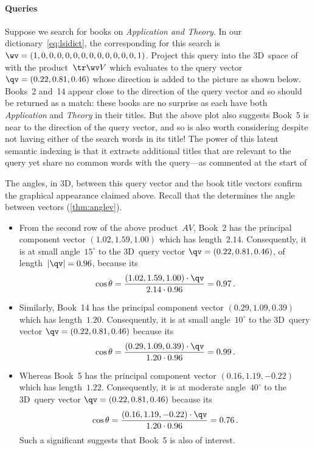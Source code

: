 \begin{reduce}
\paragraph{Queries}
Suppose we search for books on \emph{Application and Theory}.
In our dictionary~\eqref{eq:lsidict}, the corresponding  for this search is \(\wv=(1,0,0,0,0,0,0,0,0,0,0,0,0,1)\).
Project this query into the 3D~space of  with the product~\(\tr\wv V\) which evaluates to the query vector \(\qv=(0.22,0.81,0.46)\) whose direction is added to the picture as shown below.
Books~2 and~14 appear close to the direction of the query vector and so should be returned as a match: these books are no surprise as each  have both \emph{Application} and \emph{Theory} in their titles.
But the above plot also suggests Book~5 is near to the direction of the query vector, and so is also worth considering despite not having either of the search words in its title!
The power of this latent semantic indexing is that it extracts additional titles that are relevant to the query yet share no common words with the query---as commented at the start of 

The angles, in 3D, between this query vector and the book title vectors confirm the graphical appearance claimed above.
Recall that the  determines the angle between vectors (\cref{thm:anglev}).
\begin{itemize}
\item From the second row of the above product~\(AV\), Book~2 has the principal component vector \((1.02,1.59,1.00)\) which has length~\(2.14\).
Consequently, it is at small angle~\(15^\circ\) to the 3D~query vector \(\qv=(0.22,0.81,0.46)\), of length~\(|\qv|=0.96\), because its 
\begin{equation*}
\cos\theta=\frac{(1.02,1.59,1.00)\cdot\qv}{2.14\cdot0.96}
=0.97\,.
\end{equation*}

\item Similarly, Book~14 has the principal component vector \((0.29,1.09,0.39)\) which has length~\(1.20\).
Consequently, it is at small angle~\(10^\circ\) to the 3D~query vector \(\qv=(0.22,0.81,0.46)\) because its 
\begin{equation*}
\cos\theta=\frac{(0.29,1.09,0.39)\cdot\qv}{1.20\cdot0.96}
=0.99\,.
\end{equation*}

\item Whereas Book~5 has the principal component vector \((0.16,1.19,-0.22)\) which has length~\(1.22\).
Consequently, it is at moderate angle~\(40^\circ\) to the 3D~query vector \(\qv=(0.22,0.81,0.46)\) because its 
\begin{equation*}
\cos\theta=\frac{(0.16,1.19,-0.22)\cdot\qv}{1.20\cdot0.96}
=0.76\,.
\end{equation*}
Such a significant  suggests that Book~5 is also of interest.


\end{itemize}
\end{reduce}
